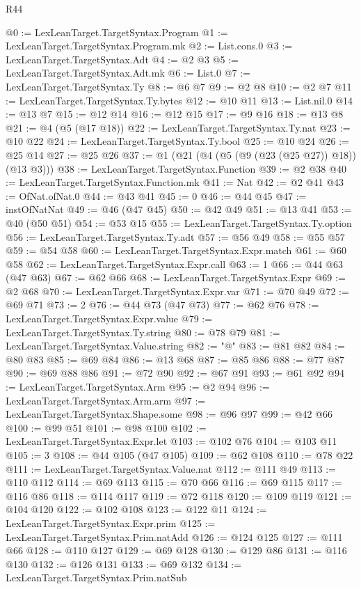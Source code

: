 \begin{lexlean}{R44}
\begin{coremodule}
@0 := LexLeanTarget.TargetSyntax.Program
@1 := LexLeanTarget.TargetSyntax.Program.mk
@2 := List.cons.{0}
@3 := LexLeanTarget.TargetSyntax.Adt
@4 := @2 @3
@5 := LexLeanTarget.TargetSyntax.Adt.mk
@6 := List.{0}
@7 := LexLeanTarget.TargetSyntax.Ty
@8 := @6 @7
@9 := @2 @8
@10 := @2 @7
@11 := LexLeanTarget.TargetSyntax.Ty.bytes
@12 := @10 @11
@13 := List.nil.{0}
@14 := @13 @7
@15 := @12 @14
@16 := @12 @15
@17 := @9 @16
@18 := @13 @8
@21 := @4 (@5 (@17 @18))
@22 := LexLeanTarget.TargetSyntax.Ty.nat
@23 := @10 @22
@24 := LexLeanTarget.TargetSyntax.Ty.bool
@25 := @10 @24
@26 := @25 @14
@27 := @25 @26
@37 := @1 (@21 (@4 (@5 (@9 (@23 (@25 @27)) @18)) (@13 @3)))
@38 := LexLeanTarget.TargetSyntax.Function
@39 := @2 @38
@40 := LexLeanTarget.TargetSyntax.Function.mk
@41 := Nat
@42 := @2 @41
@43 := OfNat.ofNat.{0}
@44 := @43 @41
@45 := 0
@46 := @44 @45
@47 := instOfNatNat
@49 := @46 (@47 @45)
@50 := @42 @49
@51 := @13 @41
@53 := @40 (@50 @51)
@54 := @53 @15
@55 := LexLeanTarget.TargetSyntax.Ty.option
@56 := LexLeanTarget.TargetSyntax.Ty.adt
@57 := @56 @49
@58 := @55 @57
@59 := @54 @58
@60 := LexLeanTarget.TargetSyntax.Expr.match
@61 := @60 @58
@62 := LexLeanTarget.TargetSyntax.Expr.call
@63 := 1
@66 := @44 @63 (@47 @63)
@67 := @62 @66
@68 := LexLeanTarget.TargetSyntax.Expr
@69 := @2 @68
@70 := LexLeanTarget.TargetSyntax.Expr.var
@71 := @70 @49
@72 := @69 @71
@73 := 2
@76 := @44 @73 (@47 @73)
@77 := @62 @76
@78 := LexLeanTarget.TargetSyntax.Expr.value
@79 := LexLeanTarget.TargetSyntax.Ty.string
@80 := @78 @79
@81 := LexLeanTarget.TargetSyntax.Value.string
@82 := "@"
@83 := @81 @82
@84 := @80 @83
@85 := @69 @84
@86 := @13 @68
@87 := @85 @86
@88 := @77 @87
@90 := @69 @88 @86
@91 := @72 @90
@92 := @67 @91
@93 := @61 @92
@94 := LexLeanTarget.TargetSyntax.Arm
@95 := @2 @94
@96 := LexLeanTarget.TargetSyntax.Arm.arm
@97 := LexLeanTarget.TargetSyntax.Shape.some
@98 := @96 @97
@99 := @42 @66
@100 := @99 @51
@101 := @98 @100
@102 := LexLeanTarget.TargetSyntax.Expr.let
@103 := @102 @76
@104 := @103 @11
@105 := 3
@108 := @44 @105 (@47 @105)
@109 := @62 @108
@110 := @78 @22
@111 := LexLeanTarget.TargetSyntax.Value.nat
@112 := @111 @49
@113 := @110 @112
@114 := @69 @113
@115 := @70 @66
@116 := @69 @115
@117 := @116 @86
@118 := @114 @117
@119 := @72 @118
@120 := @109 @119
@121 := @104 @120
@122 := @102 @108
@123 := @122 @11
@124 := LexLeanTarget.TargetSyntax.Expr.prim
@125 := LexLeanTarget.TargetSyntax.Prim.natAdd
@126 := @124 @125
@127 := @111 @66
@128 := @110 @127
@129 := @69 @128
@130 := @129 @86
@131 := @116 @130
@132 := @126 @131
@133 := @69 @132
@134 := LexLeanTarget.TargetSyntax.Prim.natSub

\end{coremodule}
\end{lexlean}
